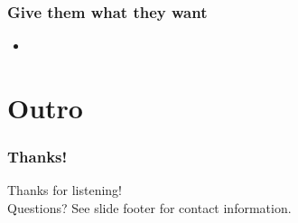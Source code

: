 \documentclass[t]{beamer}
\begin{document}
\begin{frame}
	\frametitle{Give them what they want}
	\begin{itemize}
		\item 
	\end{itemize}
\end{frame}









%





\section{Outro}

\begin{frame}
	\frametitle{Thanks!}
		\begin{center}
			\vfill
			Thanks for listening!\\
			\vfill
			Questions?
			\vfill
			See slide footer for contact information.
			\vfill
		\end{center}
\end{frame}
\end{document}
